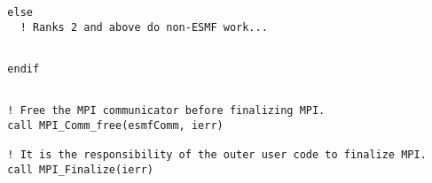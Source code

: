 
 \begin{verbatim}
  else
    ! Ranks 2 and above do non-ESMF work...
 
\end{verbatim}
 

 \begin{verbatim}
  endif
 
\end{verbatim}
 

 \begin{verbatim}
  ! Free the MPI communicator before finalizing MPI.
  call MPI_Comm_free(esmfComm, ierr)
  
  ! It is the responsibility of the outer user code to finalize MPI.
  call MPI_Finalize(ierr)
 
\end{verbatim}

\setlength{\parskip}{\oldparskip}
\setlength{\parindent}{\oldparindent}
\setlength{\baselineskip}{\oldbaselineskip}
